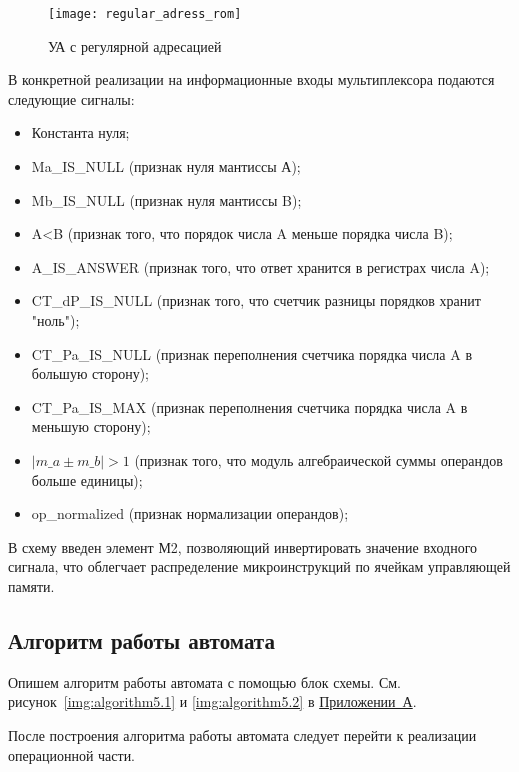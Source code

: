\documentclass[a4paper,14pt]{extarticle}
\begin{document}
\begin{figure}[h!]
	\begin{center}
		\texttt{[image: regular\_adress\_rom]}
		\caption{УА с регулярной адресацией}
		\label{img:scheme5}
	\end{center}	
\end{figure}

В конкретной реализации на информационные входы мультиплексора подаются следующие сигналы:
	\hypertarget{name}{}
\begin{itemize}

	\item Константа нуля;
	\item Ma\_IS\_NULL (признак нуля мантиссы А);
	\item Mb\_IS\_NULL (признак нуля мантиссы B);
	\item A<B (признак того, что порядок числа A меньше порядка числа B);
	\item A\_IS\_ANSWER (признак того, что ответ хранится в регистрах числа A);
	\item CT\_dP\_IS\_NULL (признак того, что счетчик разницы порядков хранит "ноль");
	\item CT\_Pa\_IS\_NULL (признак переполнения счетчика порядка числа A в большую сторону);
	\item CT\_Pa\_IS\_MAX  (признак переполнения счетчика порядка числа A в меньшую сторону);
	\item $\left|m\_a\pm m\_b\right|>1$ (признак того, что модуль алгебраической суммы операндов больше единицы);
	\item op\_normalized (признак нормализации операндов);
\end{itemize}

В схему введен элемент М2, позволяющий инвертировать значение входного сигнала, что облегчает распределение микроинструкций по ячейкам управляющей памяти.

\subsection{Алгоритм работы автомата}
Опишем алгоритм работы автомата с помощью блок схемы. См. рисунок~\ref{img:algorithm5.1} и \ref{img:algorithm5.2} в \hyperref[tam]{Приложении~А}.

После построения алгоритма работы автомата следует перейти к реализации операционной части.
\end{document}
